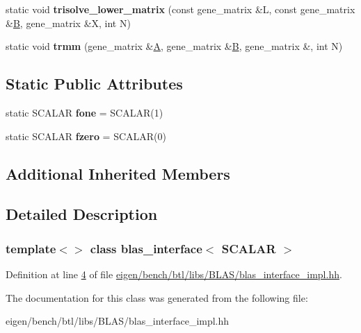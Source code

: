 \begin{DoxyCompactItemize}
static void {\bfseries trisolve\+\_\+lower\+\_\+matrix} (const gene\+\_\+matrix \&L, const gene\+\_\+matrix \&\hyperlink{group___core___module_class_eigen_1_1_matrix}{B}, gene\+\_\+matrix \&X, int N)
\item 
\mbox{\label{classblas__interface_3_01_s_c_a_l_a_r_01_4_ac921babcdbf03b5372bc2f5a927f79d2}} 
static void {\bfseries trmm} (gene\+\_\+matrix \&\hyperlink{group___core___module_class_eigen_1_1_matrix}{A}, gene\+\_\+matrix \&\hyperlink{group___core___module_class_eigen_1_1_matrix}{B}, gene\+\_\+matrix \&, int N)
\end{DoxyCompactItemize}
\subsection*{Static Public Attributes}
\begin{DoxyCompactItemize}
\item 
\mbox{\label{classblas__interface_3_01_s_c_a_l_a_r_01_4_a321b5d42dd6572078dbcf81d884675bc}} 
static S\+C\+A\+L\+AR {\bfseries fone} = S\+C\+A\+L\+AR(1)
\item 
\mbox{\label{classblas__interface_3_01_s_c_a_l_a_r_01_4_aafddc536c440a2e05ac4809e36777b40}} 
static S\+C\+A\+L\+AR {\bfseries fzero} = S\+C\+A\+L\+AR(0)
\end{DoxyCompactItemize}
\subsection*{Additional Inherited Members}


\subsection{Detailed Description}
\subsubsection*{template$<$$>$\newline
class blas\+\_\+interface$<$ S\+C\+A\+L\+A\+R $>$}



Definition at line \hyperlink{eigen_2bench_2btl_2libs_2_b_l_a_s_2blas__interface__impl_8hh_source_l00004}{4} of file \hyperlink{eigen_2bench_2btl_2libs_2_b_l_a_s_2blas__interface__impl_8hh_source}{eigen/bench/btl/libs/\+B\+L\+A\+S/blas\+\_\+interface\+\_\+impl.\+hh}.



The documentation for this class was generated from the following file\+:\begin{DoxyCompactItemize}
\item 
eigen/bench/btl/libs/\+B\+L\+A\+S/blas\+\_\+interface\+\_\+impl.\+hh\end{DoxyCompactItemize}
